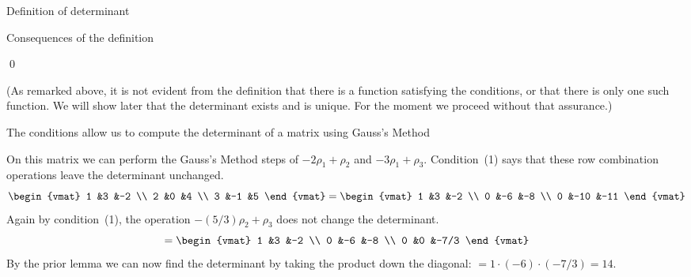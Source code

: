 \documentclass[10pt,t]{beamer}
\begin{document}
\begin{frame}{Definition of determinant}

\pause 
{}%
\end{frame}




\begin{frame}{Consequences of the definition}
\lm[le:IdenRowsDetZero]

\pause 
\pf 
{}

\pause
{}
\end{frame}
\begin{frame}

\pause
{}  
\end{frame}
\begin{frame}
\qed
\end{frame}




\begin{frame}
(As remarked above, it is not evident from the definition that there is
a function satisfying the conditions, or that there is only one such function.
We will show later that the determinant exists and is unique.
For the moment we proceed without that assurance.)

\pause
The conditions allow us to
compute the determinant of a matrix using Gauss's Method

\ex  On this matrix we can perform the Gauss's Method steps of
$-2\rho_1+\rho_2$ and $-3\rho_1+\rho_3$.
Condition~(1) says that these row combination operations
leave the determinant unchanged.
\begin{equation*}
  \begin{vmat}
    1  &3  &-2 \\
    2  &0  &4  \\
    3  &-1 &5
  \end{vmat}
  =
  \begin{vmat}
    1  &3   &-2 \\
    0  &-6  &-8  \\
    0  &-10 &-11
  \end{vmat}
\end{equation*}
\pause
Again by condition~(1), the operation
$-(5/3)\rho_2+\rho_3$ does not change the determinant.
\begin{equation*}
  =
  \begin{vmat}
    1  &3   &-2 \\
    0  &-6  &-8  \\
    0  &0   &-7/3
  \end{vmat}
\end{equation*}
\pause
By the prior lemma we can now 
find the determinant by taking the product down the
diagonal: 
$=1\cdot(-6)\cdot(-7/3)=14$.
\end{frame}
\end{document}
